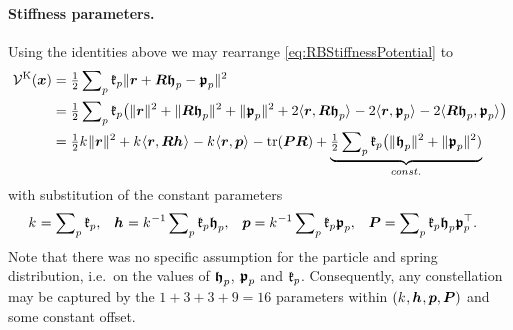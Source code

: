 \paragraph{Stiffness parameters.}
Using the identities above we may rearrange \eqref{eq:RBStiffnessPotential} to
\begin{align}\label{eq:RBStiffnessPotential2}
 \potentialStiff(\sysCoord) &= \tfrac{1}{2} \sumParticles \particleStiffness{\PidxI} \norm{\r + \R \particleBodyPos{\PidxI} - \springHubPos{\PidxI}}^2
\nonumber\\
 &= \tfrac{1}{2} \sumParticles \particleStiffness{\PidxI} \big( \norm{\r}^2 + \norm{\R \particleBodyPos{\PidxI}}^2 + \norm{\springHubPos{\PidxI}}^2 + 2\sProd{\r}{\R \particleBodyPos{\PidxI}} - 2\sProd{\r}{\springHubPos{\PidxI}} - 2\sProd{\R \particleBodyPos{\PidxI}}{\springHubPos{\PidxI}}\big)
\nonumber\\
 &= \tfrac{1}{2} \bodyStiffness{}{}\norm{\r}^2 + \bodyStiffness{}{} \sProd{\r}{\R \bodyCOS{}{}} - \bodyStiffness{}{} \sProd{\r}{\tuple{p}} - \tr(\mat{P} \R)
  + \underbrace{\tfrac{1}{2} \sumParticles \particleStiffness{\PidxI} \big( \norm{\particleBodyPos{\PidxI}}^2 + \norm{\springHubPos{\PidxI}}^2)}_{\const}
\end{align}
with substitution of the constant parameters
\begin{align}
 \bodyStiffness{}{} &= \sumParticles \particleStiffness{\PidxI},&
 \bodyCOS{}{} &= \bodyStiffness{}{}^{-1} \sumParticles \particleStiffness{\PidxI} \particleBodyPos{\PidxI},&
 \tuple{p} &= \bodyStiffness{}{}^{-1} \sumParticles \particleStiffness{\PidxI} \springHubPos{\PidxI},&
 \mat{P} &= \sumParticles \particleStiffness{\PidxI} \particleBodyPos{\PidxI} \springHubPos{\PidxI}^\top.
\end{align}
Note that there was no specific assumption for the particle and spring distribution, i.e.\ on the values of $\boldsymbol{\mathfrak{h}}_{p}$, $\boldsymbol{\mathfrak{p}}_{p}$ and $\mathfrak{k}_{p}$.
Consequently, any constellation may be captured by the $1+3+3+9=16$ parameters within $(\bodyStiffness{}{}, \bodyCOS{}{}, \tuple{p}, \mat{P})$ and some constant offset.

